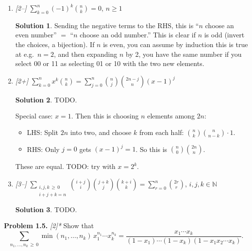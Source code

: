 \documentclass[11pt]{article}
\theoremstyle{definition}
\newtheorem*{solution}{Solution}
\newcommand{\N}{\mathbb{N}}
\newcounter{probnum}
\newcommand{\problem}[1]{%
  \setcounter{probnum}{#1}%
  \medskip
  \noindent\textbf{Problem 1.#1.}\quad
}
\begin{document}
\begin{enumerate}[label=(\alph*)]
  \item \textit{[2--]} $\displaystyle\sum_{k=0}^{n}(-1)^{k}\binom{n}{k} = 0$, \quad $n\geq 1$
    \begin{solution}
    Sending the negative terms to the RHS, this is ``$n$ choose an even number''
    $=$ ``$n$ choose an odd number.'' This is clear if $n$ is odd (invert the
    choices, a bijection). If $n$ is even, you can assume by induction this is true
    at e.g.\ $n=2$, and then expanding $n$ by 2, you have the same number if you
    select 00 or 11 as selecting 01 or 10 with the two new elements.
    \end{solution}

  \item \textit{[2+]}
    $\displaystyle\sum_{k=0}^{n}x^k\binom{n}{k}
     = \sum_{j=0}^{n}\binom{n}{j}\binom{2n-j}{n}(x-1)^j$
    \begin{solution}
    TODO\@.

    Special case: $x=1$. Then this is choosing $n$ elements among $2n$:
    \begin{itemize}
      \item LHS: Split $2n$ into two, and choose $k$ from each half:
        $\binom{n}{k}\binom{n}{n-k} \cdot 1$.
      \item RHS: Only $j=0$ gets $(x-1)^j = 1$. So this is $\binom{n}{0}\binom{2n}{n}$.
    \end{itemize}
    These are equal. TODO: try with $x = 2^k$.
    \end{solution}

  \item \textit{[3--]}
    $\displaystyle\sum_{\substack{i,j,k\,\geq\,0\\i+j+k=n}}
       \binom{i+j}{i}\binom{j+k}{j}\binom{k+i}{k}
     = \sum_{r=0}^{n}\binom{2r}{r}$,
    \quad $i,j,k\in\N$
    \begin{solution}
    TODO\@.
    \end{solution}
\end{enumerate}

\problem{5} \textit{[2]*}
Show that
\[
  \sum_{n_1,\ldots,n_k\,\geq\,0} \min(n_1,\ldots,n_k)\, x_1^{n_1}\cdots x_k^{n_k}
  = \frac{x_1\cdots x_k}{(1-x_1)\cdots(1-x_k)(1-x_1 x_2\cdots x_k)}.
\]
\end{document}
